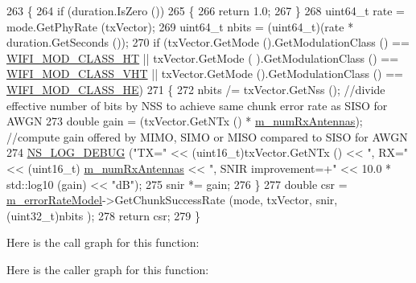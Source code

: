 \begin{DoxyCode}
263 \{
264   \textcolor{keywordflow}{if} (duration.IsZero ())
265     \{
266       \textcolor{keywordflow}{return} 1.0;
267     \}
268   uint64\_t rate = mode.GetPhyRate (txVector);
269   uint64\_t nbits = (uint64\_t)(rate * duration.GetSeconds ());
270   \textcolor{keywordflow}{if} (txVector.GetMode ().GetModulationClass () == \hyperlink{namespacens3_aa999e1221606a2b21b1eb33c2007c217a6ac45cac36cc4454649435d24ebf349c}{WIFI\_MOD\_CLASS\_HT} || txVector.GetMode (
      ).GetModulationClass () == \hyperlink{namespacens3_aa999e1221606a2b21b1eb33c2007c217a9863e4342bf5c238c74dddfc4d96c67e}{WIFI\_MOD\_CLASS\_VHT} || txVector.GetMode ().GetModulationClass ()
       == \hyperlink{namespacens3_aa999e1221606a2b21b1eb33c2007c217abfa4f7272510045a9b43e8ac27ac13b0}{WIFI\_MOD\_CLASS\_HE})
271     \{
272       nbits /= txVector.GetNss (); \textcolor{comment}{//divide effective number of bits by NSS to achieve same chunk error
       rate as SISO for AWGN}
273       \textcolor{keywordtype}{double} gain = (txVector.GetNTx () * \hyperlink{classns3_1_1InterferenceHelper_a3c4c246de043decec1d726c10cda34f7}{m\_numRxAntennas}); \textcolor{comment}{//compute gain offered by MIMO,
       SIMO or MISO compared to SISO for AWGN}
274       \hyperlink{group__logging_ga413f1886406d49f59a6a0a89b77b4d0a}{NS\_LOG\_DEBUG} (\textcolor{stringliteral}{"TX="} << (uint16\_t)txVector.GetNTx () << \textcolor{stringliteral}{", RX="} << (uint16\_t)
      \hyperlink{classns3_1_1InterferenceHelper_a3c4c246de043decec1d726c10cda34f7}{m\_numRxAntennas} << \textcolor{stringliteral}{", SNIR improvement=+"} << 10.0 * std::log10 (gain) << \textcolor{stringliteral}{"dB"});
275       snir *= gain;
276     \}
277   \textcolor{keywordtype}{double} csr = \hyperlink{classns3_1_1InterferenceHelper_a77201b812b56550608a3f53394868c4e}{m\_errorRateModel}->GetChunkSuccessRate (mode, txVector, snir, (uint32\_t)nbits
      );
278   \textcolor{keywordflow}{return} csr;
279 \}
\end{DoxyCode}


Here is the call graph for this function\+:




Here is the caller graph for this function\+:


